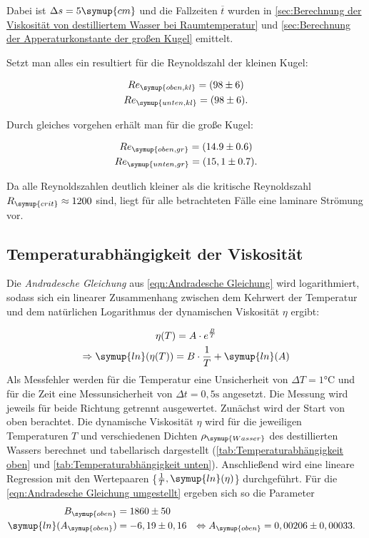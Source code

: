 Dabei ist $\Delta s=5\symup{cm}$ und die Fallzeiten $\overline{t}$ wurden in
\autoref{sec:Berechnung der Viskosität von destilliertem Wasser bei Raumtemperatur} und
\autoref{sec:Berechnung der Apperaturkonstante der großen Kugel} emittelt.

Setzt man alles ein resultiert für die Reynoldszahl der kleinen Kugel:

\begin{gather}
  Re_{\symup{oben,kl}} = (98\pm6) \notag \\
  Re_{\symup{unten,kl}} = (98\pm6) \notag .
\end{gather}

Durch gleiches vorgehen erhält man für die große Kugel:

\begin{gather}
  Re_{\symup{oben,gr}} = (14.9\pm0.6) \notag \\
  Re_{\symup{unten,gr}} = (15,1\pm0.7) \notag .
\end{gather}

Da alle Reynoldszahlen deutlich kleiner als die kritische Reynoldszahl $R_{\symup{crit}}\approx 1200$ sind, liegt für alle 
betrachteten Fälle eine laminare Strömung vor.

\subsection{Temperaturabhängigkeit der Viskosität}
\label{sec:Temperaturabhängigkeit der Viskosität}
Die \textit{Andradesche Gleichung} aus \autoref{eqn:Andradesche Gleichung} wird logarithmiert, sodass sich ein linearer Zusammenhang
zwischen dem Kehrwert der Temperatur und dem natürlichen Logarithmus der dynamischen Viskosität $\eta$ ergibt:

\begin{gather}
  \eta (T)=A\cdot e^{\frac{B}{T}} \\
  \Rightarrow \symup{ln}(\eta(T)) = B \cdot \frac{1}{T} + \symup{ln}(A) \label{eqn:Andradesche Gleichung umgestellt}
\end{gather}
Als Messfehler werden für die Temperatur eine Unsicherheit von $\Delta T = 1 \unit{\celsius}$ und für die Zeit 
eine Messunsicherheit von $\Delta t = 0,5 \unit{\second}$ angesetzt.
Die Messung wird jeweils für beide Richtung getrennt ausgewertet. Zunächst wird der Start von oben berachtet.
Die dynamische Viskosität $\eta$ wird für die jeweiligen Temperaturen $T$ und verschiedenen Dichten $\rho_{\symup{Wasser}}$ 
des destillierten Wassers berechnet und tabellarisch dargestellt (\autoref{tab:Temperaturabhängigkeit oben} 
und \autoref{tab:Temperaturabhängigkeit unten}). Anschließend wird eine lineare Regression mit den Wertepaaren 
\{$\frac{1}{T}, \symup{ln}(\eta)$\} durchgeführt. Für die \autoref{eqn:Andradesche Gleichung umgestellt} ergeben sich so die Parameter
\begin{align}
  B_{\symup{oben}}&=1860\pm50 \\
  \symup{ln}(A_{\symup{oben}}) &= -6,19\pm0,16 &\Leftrightarrow A_{\symup{oben}}&=0,00206\pm0,00033 .
\end{align}

